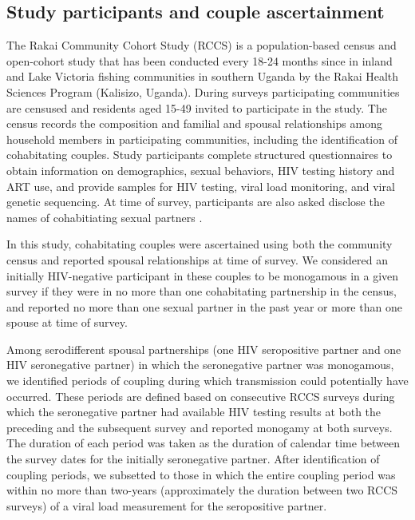 \documentclass{article}[11pt]
\newcommand{\var}[1]{\DTLfetch{\mydata}{var}{#1}{val}}
\begin{document}
\subsection*{Study participants and couple ascertainment}
The Rakai Community Cohort Study (RCCS) is a population-based census and open-cohort study that has been conducted every 18-24 months since \var{r1_minYear} in inland and Lake Victoria fishing communities in southern Uganda by the Rakai Health Sciences Program (Kalisizo, Uganda). During surveys participating communities are censused and residents aged 15-49 invited to participate in the study. The census records the composition and familial and spousal relationships among household members in participating communities, including the identification of cohabitating couples. Study participants complete structured questionnaires to obtain information on demographics, sexual behaviors, HIV testing history and ART use, and provide samples for HIV testing, viral load monitoring, and viral genetic sequencing. At time of survey, participants are also asked disclose the names of cohabitiating sexual partners . 

In this study, cohabitating couples were ascertained  using both the community census and reported spousal relationships at time of survey.  We considered an  initially HIV-negative participant in these couples to be monogamous in a given survey if they were in no more than one cohabitating partnership in the census, and reported no more than one sexual partner in the past year or more than one spouse at time of survey.  

Among serodifferent spousal partnerships (one HIV seropositive partner and one HIV seronegative partner) in which the seronegative partner was monogamous, we identified periods of coupling during which transmission could potentially have occurred. These periods are defined based on consecutive RCCS surveys during which the seronegative partner had available HIV testing results at both the preceding and the subsequent survey and reported monogamy at both surveys. The duration of each period was taken as the duration of calendar time between the survey dates for the initially seronegative partner. After identification of coupling periods, we subsetted to those in which the entire coupling period was within no more than two-years (approximately the duration between two RCCS surveys) of a viral load measurement for the seropositive partner. 
\end{document}
